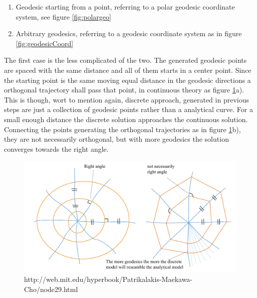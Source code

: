 \begin{enumerate}

\item Geodesic starting from a point, referring to a polar geodesic coordinate system, see figure \ref{fig:polargeo}
\item Arbitrary geodesics, referring to a geodesic coordinate system  as in figure \ref{fig:geodesicCoord}
\end{enumerate}
\vspace{5mm}
The first case is the less complicated of the two. The generated geodesic points are spaced with the same distance and all of them starts in a center point. Since the starting point is the same moving equal distance in the geodesic directions a orthogonal trajectory shall pass that point, in continuous theory as figure \ref{fig:polaralg}a). This is though, wort to mention again,  discrete approach, generated in previous steps are just a collection of geodesic points rather than a analytical curve. For a small enough distance the discrete solution approaches the continuous solution. Connecting the points generating the orthogonal trajectories as in figure \ref{fig:polaralg}b), they are not necessarily orthogonal, but with more geodesics the solution converges towards the right angle. 

\begin{figure}[H]
\centering
\includegraphics[width = 1.0\linewidth ]{figure/Method/polargeo.pdf}
\caption{http://web.mit.edu/hyperbook/Patrikalakis-Maekawa-Cho/node29.html}
\label{fig:polaralg}
\end{figure}


